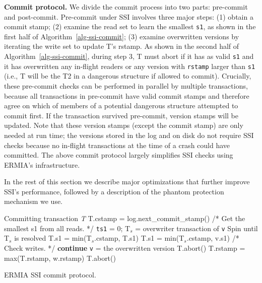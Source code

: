 {\bf Commit protocol.}
We divide the commit process into two parts: pre-commit and post-commit. Pre-commit under SSI involves three major steps: (1) obtain a commit stamp; (2) examine the read set to learn the smallest \texttt{s1}, as shown in the first half of Algorithm~\ref{alg-ssi-commit}; (3) examine overwritten versions by iterating the write set to update T's rstamp. As shown in the second half of Algorithm~\ref{alg-ssi-commit}, during step 3, T must abort if it has as valid \texttt{s1} and it has overwritten any in-flight readers or any version with \texttt{rstamp} larger than \texttt{s1} (i.e., T will be the T2 in a dangerous structure if allowed to commit). Crucially, these pre-commit checks can be performed in parallel by multiple transactions, because all transactions in pre-commit have valid commit stamps and therefore agree on which of members of a potential dangerous structure attempted to commit first. If the transaction survived pre-commit, version stamps will be updated. Note that these version stamps (except the commit stamp) are only needed at run time; the versions stored in the log and on disk do not require SSI checks because no in-flight transactions at the time of a crash could have committed. The above commit protocol largely simplifies SSI checks using ERMIA's infrastructure.

In the rest of this section we describe major optimizations that further improve SSI's performance, followed by a description of the phantom protection mechanism we use.

\begin{algorithm}
\begin{algorithmic}[1]
 Committing transaction \textit{T}
\STATE T.cstamp = log.next\_commit\_stamp()
\STATE /* Get the smallest s1 from all reads. */
\STATE \texttt{ts1} = 0;
\STATE T$_s$ = overwriter transaction of \texttt{v}
\STATE Spin until T$_s$ is resolved
\STATE T.s1 = min(T$_s$.cstamp, T.s1)
\ENDIF
\ELSE
\STATE T.s1 = min(T$_s$.cstamp, v.s1)
\ENDIF
\ENDFOR
\STATE
\STATE /* Check writes. */
\STATE \textbf{continue}
\ENDIF
\STATE \texttt{v} = the overwritten version
\STATE T.abort()
\ENDIF
\STATE T.rstamp = max(T.rstamp, w.rstamp)
\STATE T.abort()
\ENDIF
\ENDFOR
\ENDFOR
\end{algorithmic}
\label{alg-ssi-commit}
\caption{ERMIA SSI commit protocol.}
\end{algorithm}

